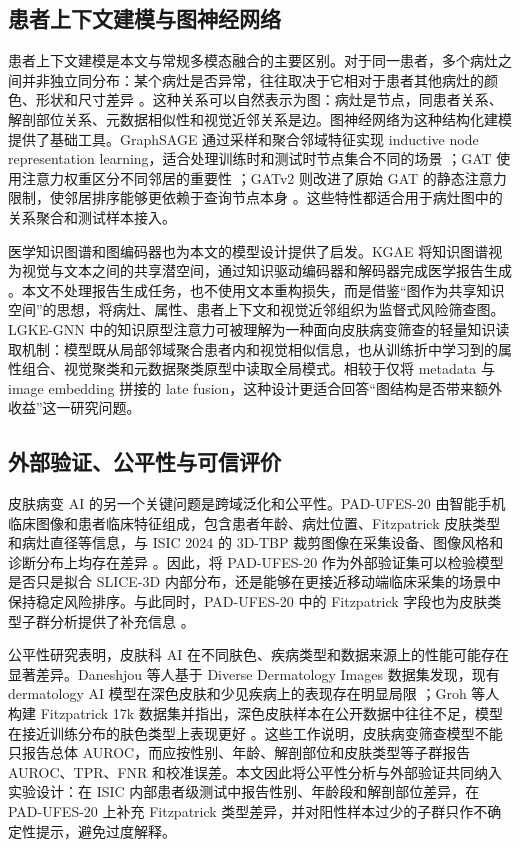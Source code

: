 \documentclass[UTF8,a4paper,10pt,twocolumn,fontset=fandol]{ctexart}
\begin{document}
\subsection{患者上下文建模与图神经网络}

患者上下文建模是本文与常规多模态融合的主要区别。对于同一患者，多个病灶之间并非独立同分布：某个病灶是否异常，往往取决于它相对于患者其他病灶的颜色、形状和尺寸差异 \cite{rotemberg2021patient}。这种关系可以自然表示为图：病灶是节点，同患者关系、解剖部位关系、元数据相似性和视觉近邻关系是边。图神经网络为这种结构化建模提供了基础工具。GraphSAGE 通过采样和聚合邻域特征实现 inductive node representation learning，适合处理训练时和测试时节点集合不同的场景 \cite{hamilton2017graphsage}；GAT 使用注意力权重区分不同邻居的重要性 \cite{velickovic2018gat}；GATv2 则改进了原始 GAT 的静态注意力限制，使邻居排序能够更依赖于查询节点本身 \cite{brody2022gatv2}。这些特性都适合用于病灶图中的关系聚合和测试样本接入。

医学知识图谱和图编码器也为本文的模型设计提供了启发。KGAE 将知识图谱视为视觉与文本之间的共享潜空间，通过知识驱动编码器和解码器完成医学报告生成 \cite{liu2021kgae}。本文不处理报告生成任务，也不使用文本重构损失，而是借鉴“图作为共享知识空间”的思想，将病灶、属性、患者上下文和视觉近邻组织为监督式风险筛查图。LGKE-GNN 中的知识原型注意力可被理解为一种面向皮肤病变筛查的轻量知识读取机制：模型既从局部邻域聚合患者内和视觉相似信息，也从训练折中学习到的属性组合、视觉聚类和元数据聚类原型中读取全局模式。相较于仅将 metadata 与 image embedding 拼接的 late fusion，这种设计更适合回答“图结构是否带来额外收益”这一研究问题。

\subsection{外部验证、公平性与可信评价}

皮肤病变 AI 的另一个关键问题是跨域泛化和公平性。PAD-UFES-20 由智能手机临床图像和患者临床特征组成，包含患者年龄、病灶位置、Fitzpatrick 皮肤类型和病灶直径等信息，与 ISIC 2024 的 3D-TBP 裁剪图像在采集设备、图像风格和诊断分布上均存在差异 \cite{pacheco2020padufes}。因此，将 PAD-UFES-20 作为外部验证集可以检验模型是否只是拟合 SLICE-3D 内部分布，还是能够在更接近移动端临床采集的场景中保持稳定风险排序。与此同时，PAD-UFES-20 中的 Fitzpatrick 字段也为皮肤类型子群分析提供了补充信息 \cite{pacheco2020padufes}。

公平性研究表明，皮肤科 AI 在不同肤色、疾病类型和数据来源上的性能可能存在显著差异。Daneshjou 等人基于 Diverse Dermatology Images 数据集发现，现有 dermatology AI 模型在深色皮肤和少见疾病上的表现存在明显局限 \cite{daneshjou2022disparities}；Groh 等人构建 Fitzpatrick 17k 数据集并指出，深色皮肤样本在公开数据中往往不足，模型在接近训练分布的肤色类型上表现更好 \cite{groh2021fitzpatrick17k}。这些工作说明，皮肤病变筛查模型不能只报告总体 AUROC，而应按性别、年龄、解剖部位和皮肤类型等子群报告 AUROC、TPR、FNR 和校准误差。本文因此将公平性分析与外部验证共同纳入实验设计：在 ISIC 内部患者级测试中报告性别、年龄段和解剖部位差异，在 PAD-UFES-20 上补充 Fitzpatrick 类型差异，并对阳性样本过少的子群只作不确定性提示，避免过度解释。
\end{document}
